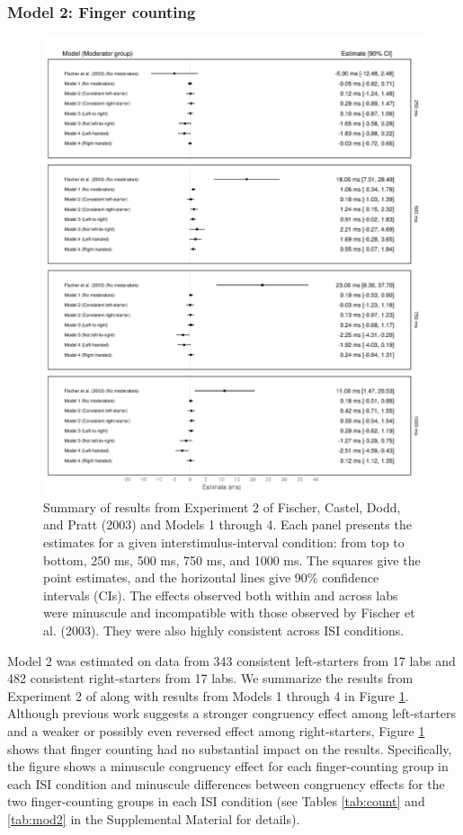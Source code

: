 \documentclass[man,floatsintext]{apa6}
\theoremstyle{definition}
\theoremstyle{definition}
\theoremstyle{definition}
\theoremstyle{remark}
\begin{document}
\subsubsection{Model 2: Finger
counting}\label{model-2-finger-counting-1}

\begin{figure}

{\centering \includegraphics[width=.8\textwidth]{meta_summaryv4} 

}

\caption{Summary of results from Experiment 2 of Fischer, Castel,
Dodd, and Pratt (2003) and Models 1 through 4. Each panel presents the
estimates for a given interstimulus-interval condition: from top to
bottom, 250 ms, 500 ms, 750 ms, and 1000 ms. The squares give the point
estimates, and the horizontal lines give 90\% confidence intervals
(CIs). The effects observed both within and across labs were minuscule
and incompatible with those observed by Fischer et al. (2003). They were
also highly consistent across ISI conditions.}\label{fig:metasum}
\end{figure}

Model 2 was estimated on data from 343 consistent left-starters from 17
labs and 482 consistent right-starters from 17 labs. We summarize the
results from Experiment 2 of \textcite{Fischer:2003ju} along with
results from Models 1 through 4 in Figure \ref{fig:metasum}. Although
previous work suggests a stronger congruency effect among left-starters
and a weaker or possibly even reversed effect among right-starters,
Figure \ref{fig:metasum} shows that finger counting had no substantial
impact on the results. Specifically, the figure shows a minuscule
congruency effect for each finger-counting group in each ISI condition
and minuscule differences between congruency effects for the two
finger-counting groups in each ISI condition (see Tables \ref{tab:count}
and \ref{tab:mod2} in the Supplemental Material for details).
\end{document}
